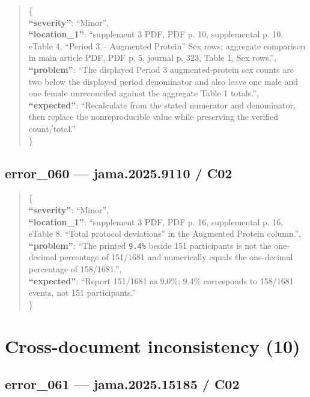 \documentclass[
  letterpaper,
  9pt]{extreport}
\begin{document}
\begin{quote}
\{\\
\textbf{``severity''}: ``Minor'',\\
\textbf{``location\_1''}: ``supplement 3 PDF, PDF p. 10, supplemental p.
10, eTable 4, ``Period 3 -- Augmented Protein'' Sex rows; aggregate
comparison in main article PDF, PDF p. 5, journal p. 323, Table 1, Sex
rows.'',\\
\textbf{``problem''}: ``The displayed Period 3 augmented-protein sex
counts are two below the displayed period denominator and also leave one
male and one female unreconciled against the aggregate Table 1
totals.'',\\
\textbf{``expected''}: ``Recalculate from the stated numerator and
denominator, then replace the nonreproducible value while preserving the
verified count/total.''\\
\}
\end{quote}

\hypertarget{error_060--jama20259110--c02}{%
\subsection{error\_060 --- jama.2025.9110 /
C02}\label{error_060--jama20259110--c02}}

\begin{quote}
\{\\
\textbf{``severity''}: ``Minor'',\\
\textbf{``location\_1''}: ``supplement 3 PDF, PDF p. 16, supplemental p.
16, eTable 8, ``Total protocol deviations'' in the Augmented Protein
column.'',\\
\textbf{``problem''}: ``The printed \texttt{9.4\%} beside 151
participants is not the one-decimal percentage of 151/1681 and
numerically equals the one-decimal percentage of 158/1681.'',\\
\textbf{``expected''}: ``Report 151/1681 as 9.0\%; 9.4\% corresponds to
158/1681 events, not 151 participants.''\\
\}
\end{quote}

\hypertarget{cross-document-inconsistency-10}{%
\section{Cross-document inconsistency
(10)}\label{cross-document-inconsistency-10}}

\hypertarget{error_061--jama202515185--c02}{%
\subsection{error\_061 --- jama.2025.15185 /
C02}\label{error_061--jama202515185--c02}}
\end{document}
